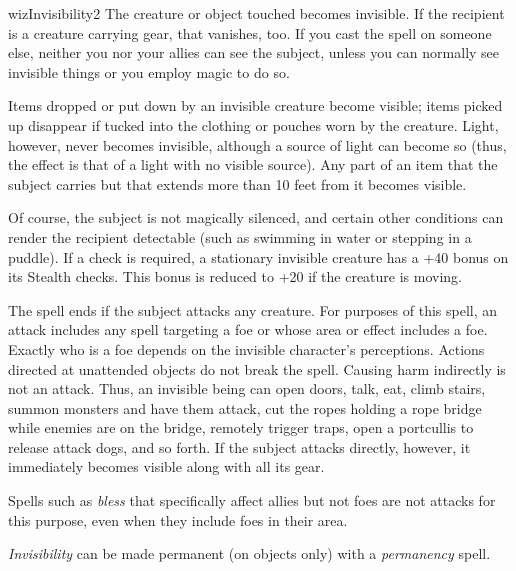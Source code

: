 \begin{spellcard}{wiz}{Invisibility}{2}
  \newcommand{\hauntstatistics}{NULL}
  \newcommand{\ruse}{0}
  \newcommand{\draconic}{0}
  \newcommand{\meditative}{0}
  \spellcardinfo{}
  The creature or object touched becomes invisible. If the recipient is a
  creature carrying gear, that vanishes, too. If you cast the spell on
  someone else, neither you nor your allies can see the subject, unless
  you can normally see invisible things or you employ magic to do so.

  Items dropped or put down by an invisible creature become visible; items
  picked up disappear if tucked into the clothing or pouches worn by the
  creature. Light, however, never becomes invisible, although a source of
  light can become so (thus, the effect is that of a light with no visible
  source). Any part of an item that the subject carries but that extends
  more than 10 feet from it becomes visible.

  Of course, the subject is not magically silenced, and certain other
  conditions can render the recipient detectable (such as swimming in
  water or stepping in a puddle). If a check is required, a stationary
  invisible creature has a +40 bonus on its Stealth checks. This bonus is
  reduced to +20 if the creature is moving.

  The spell ends if the subject
  attacks any creature. For purposes of this spell, an attack includes any
  spell targeting a foe or whose area or effect includes a foe. Exactly
  who is a foe depends on the invisible character's perceptions. Actions
  directed at unattended objects do not break the spell. Causing harm
  indirectly is not an attack. Thus, an invisible being can open doors,
  talk, eat, climb stairs, summon monsters and have them attack, cut the
  ropes holding a rope bridge while enemies are on the bridge, remotely
  trigger traps, open a portcullis to release attack dogs, and so forth.
  If the subject attacks directly, however, it immediately becomes visible
  along with all its gear.

  Spells such as \emph{bless} that specifically affect allies but not foes
  are not attacks for this purpose, even when they include foes in their
  area.

  \emph{Invisibility} can be made permanent (on objects only) with a
  \emph{permanency} spell.

\end{spellcard}
